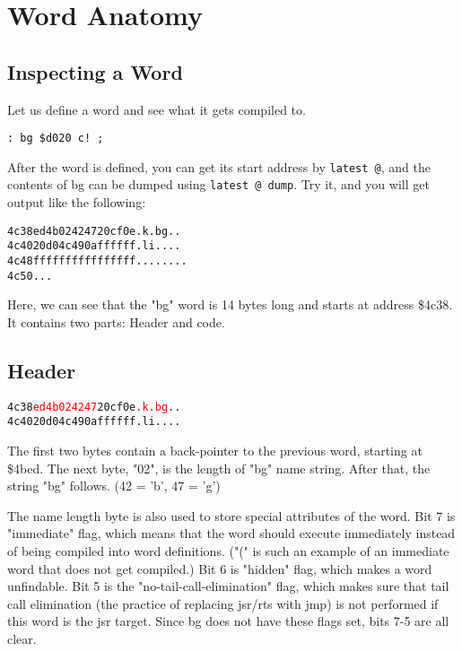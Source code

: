 \chapter{Word Anatomy}

\section{Inspecting a Word}

Let us define a word and see what it gets compiled to.

\begin{verbatim}
: bg $d020 c! ;
\end{verbatim}

After the word is defined, you can get its start address by \texttt{latest @}, and the contents of bg can be dumped using \texttt{latest @ dump}. Try it, and you will get output like the following:

\begin{alltt}
4c38  ed 4b 02 42 47 20 cf 0e .k.bg ..
4c40  20 d0 4c 49 0a ff ff ff  .li....
4c48  ff ff ff ff ff ff ff ff ........
4c50  ...
\end{alltt}

Here, we can see that the "bg" word is 14 bytes long and starts at address \$4c38. It contains two parts: Header and code.

\section{Header}

\begin{alltt}
4c38  \textcolor{red}{ed 4b 02 42 47} 20 cf 0e \textcolor{red}{.k.bg} ..
4c40  20 d0 4c 49 0a ff ff ff  .li....
\end{alltt}

The first two bytes contain a back-pointer to the previous word, starting at \$4bed. The next byte, "02", is the length of "bg" name string. After that, the string "bg" follows. (42 = 'b', 47 = 'g')

The name length byte is also used to store special attributes of the word. Bit 7 is "immediate" flag, which means that the word should execute immediately instead of being compiled into word definitions. ("(" is such an example of an immediate word that does not get compiled.) Bit 6 is "hidden" flag, which makes a word unfindable. Bit 5 is the "no-tail-call-elimination" flag, which makes sure that tail call elimination (the practice of replacing jsr/rts with jmp) is not performed if this word is the jsr target. Since bg does not have these flags set, bits 7-5 are all clear.

